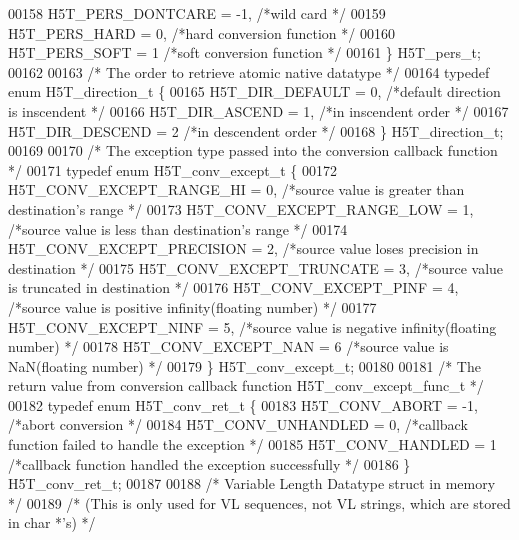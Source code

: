 \begin{DoxyCode}
00158     H5T\_PERS\_DONTCARE   = -1,   \textcolor{comment}{/*wild card                  */}
00159     H5T\_PERS\_HARD   = 0,    \textcolor{comment}{/*hard conversion function           */}
00160     H5T\_PERS\_SOFT   = 1     \textcolor{comment}{/*soft conversion function           */}
00161 \} H5T\_pers\_t;
00162 
00163 \textcolor{comment}{/* The order to retrieve atomic native datatype */}
00164 \textcolor{keyword}{typedef} \textcolor{keyword}{enum} H5T\_direction\_t \{
00165     H5T\_DIR\_DEFAULT     = 0,    \textcolor{comment}{/*default direction is inscendent            */}
00166     H5T\_DIR\_ASCEND      = 1,    \textcolor{comment}{/*in inscendent order                        */}
00167     H5T\_DIR\_DESCEND     = 2     \textcolor{comment}{/*in descendent order                        */}
00168 \} H5T\_direction\_t;
00169 
00170 \textcolor{comment}{/* The exception type passed into the conversion callback function */}
00171 \textcolor{keyword}{typedef} \textcolor{keyword}{enum} H5T\_conv\_except\_t \{
00172     H5T\_CONV\_EXCEPT\_RANGE\_HI       = 0,   \textcolor{comment}{/*source value is greater than destination's range */}
00173     H5T\_CONV\_EXCEPT\_RANGE\_LOW      = 1,   \textcolor{comment}{/*source value is less than destination's range    */}
00174     H5T\_CONV\_EXCEPT\_PRECISION      = 2,   \textcolor{comment}{/*source value loses precision in destination      */}
00175     H5T\_CONV\_EXCEPT\_TRUNCATE       = 3,   \textcolor{comment}{/*source value is truncated in destination         */}
00176     H5T\_CONV\_EXCEPT\_PINF           = 4,   \textcolor{comment}{/*source value is positive infinity(floating number) */}
00177     H5T\_CONV\_EXCEPT\_NINF           = 5,   \textcolor{comment}{/*source value is negative infinity(floating number) */}
00178     H5T\_CONV\_EXCEPT\_NAN            = 6    \textcolor{comment}{/*source value is NaN(floating number)             */}
00179 \} H5T\_conv\_except\_t;
00180 
00181 \textcolor{comment}{/* The return value from conversion callback function H5T\_conv\_except\_func\_t */}
00182 \textcolor{keyword}{typedef} \textcolor{keyword}{enum} H5T\_conv\_ret\_t \{
00183     H5T\_CONV\_ABORT      = -1,   \textcolor{comment}{/*abort conversion                           */}
00184     H5T\_CONV\_UNHANDLED  = 0,    \textcolor{comment}{/*callback function failed to handle the exception      */}
00185     H5T\_CONV\_HANDLED    = 1     \textcolor{comment}{/*callback function handled the exception successfully  */}
00186 \} H5T\_conv\_ret\_t;
00187 
00188 \textcolor{comment}{/* Variable Length Datatype struct in memory */}
00189 \textcolor{comment}{/* (This is only used for VL sequences, not VL strings, which are stored in char *'s) */}

\end{DoxyCode}
